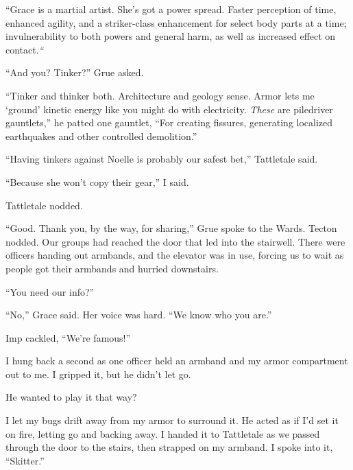 ``Grace is a martial artist.  She's got a power spread.  Faster perception of time, enhanced agility, and a striker-class enhancement for select body parts at a time; invulnerability to both powers and general harm, as well as increased effect on contact.\emph{``}



``And you?  Tinker?'' Grue asked.



``Tinker and thinker both.  Architecture and geology sense.  Armor lets me `ground' kinetic energy like you might do with electricity.  \emph{These} are piledriver gauntlets,'' he patted one gauntlet, ``For creating fissures, generating localized earthquakes and other controlled demolition.''



``Having tinkers against Noelle is probably our safest bet,'' Tattletale said.



``Because she won't copy their gear,'' I said.



Tattletale nodded.



``Good.  Thank you, by the way, for sharing,'' Grue spoke to the Wards.  Tecton nodded. Our groups had reached the door that led into the stairwell.  There were officers handing out armbands, and the elevator was in use, forcing us to wait as people got their armbands and hurried downstairs.



``You need our info?''



``No,'' Grace said.  Her voice was hard.  ``We know who you are.''



Imp cackled, ``We're famous!''



I hung back a second as one officer held an armband and my armor compartment out to me.  I gripped it, but he didn't let go.



He wanted to play it that way?



I let my bugs drift away from my armor to surround it.  He acted as if I'd set it on fire, letting go and backing away.  I handed it to Tattletale as we passed through the door to the stairs, then strapped on my armband.  I spoke into it, ``Skitter.''



